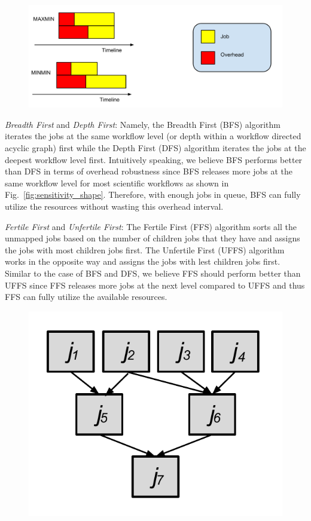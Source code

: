 \begin{figure}[htb]
\centering
 \includegraphics[width=1.0\linewidth]{figures/sensitivity/longest.pdf}
  \label{fig:sensitivity_longest}
\end{figure}
\emph{Breadth First} and \emph{Depth First}: Namely, the Breadth First (BFS) algorithm iterates the jobs at the same workflow level (or depth within a workflow directed acyclic graph) first while the Depth First (DFS) algorithm iterates the jobs at the deepest workflow level first. Intuitively speaking, we believe BFS performs better than DFS in terms of overhead robustness since BFS releases more jobs at the same workflow level for most scientific workflows as shown in Fig.~\ref{fig:sensitivity_shape}. Therefore, with enough jobs in queue, BFS can fully utilize the resources without wasting this overhead interval.  

\emph{Fertile First} and \emph{Unfertile First}: The Fertile First (FFS) algorithm sorts all the unmapped jobs based on the number of children jobs that they have and assigns the jobs with most children jobs first. The Unfertile First (UFFS) algorithm works in the opposite way and assigns the jobs with lest children jobs first. Similar to the case of BFS and DFS, we believe FFS should perform better than UFFS since FFS releases more jobs at the next level compared to UFFS and thus FFS can fully utilize the available resources. 

\begin{figure}[htb]
\centering
 \includegraphics[width=0.6\linewidth]{figures/sensitivity/impact_factor.pdf}
  \label{fig:sensitivity_impact}
\end{figure}

